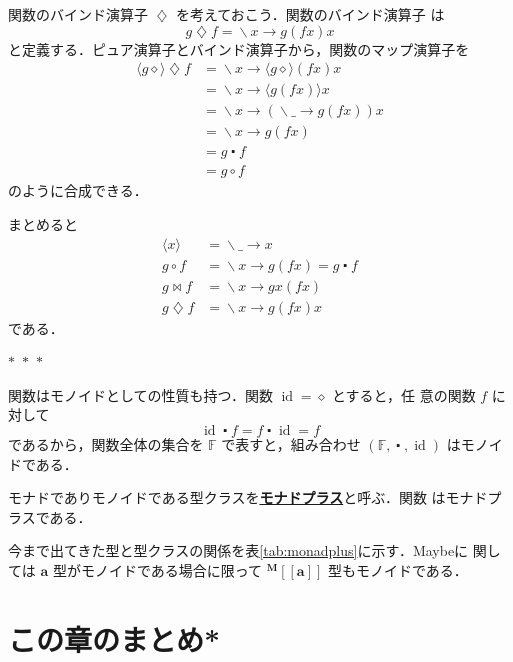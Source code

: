 \documentclass[a5paper,twoside,fleqn,draft]{jsbook}
\def\[{[\![}
\def\]{]\!]}
\newcommand{\separator}{\begin{center}$*$~$*$~$*$\end{center}}
\newcommand{\keyword}[1]{{\underline{\textbf{#1}}}}
\newcommand{\mAnonParam}{\diamond}
\newcommand{\mSpecialFunc}[1]{#1}
\DeclareMathOperator{\mId}{\mSpecialFunc{id}}
\DeclareMathOperator{\mAppMapFunc}{\bowtie}
\DeclareMathOperator{\mBindFunc}{\diamondsuit}
\DeclareMathOperator{\mComp}{\centerdot}
\DeclareMathOperator{\mLambda}{\backslash}
\DeclareMathOperator{\mLambdaArrow}{\rightarrow}
\DeclareMathOperator{\mMapFunc}{\circ}
\newcommand{\mSpecialSet}[1]{\mathbb{#1}}
\newcommand{\mFSet}{\mSpecialSet{F}}
\newcommand{\mType}[1]{\mathbf{#1}} %
\newcommand{\mA}{\mType{a}}
\newcommand{\mTypeAssemble}[2]{{}^\mType{#1}\[\mType{#2}\]}
\newcommand{\mMaybeType}[1]{\mTypeAssemble{M}{#1}}
\newcommand{\mFuncWith}[1]{\langle#1\rangle}
\newcommand{\mLambdaEXP}[2]{\mLambda{#1}\mLambdaArrow{#2}} %
\begin{document}
関数のバインド演算子 $\mBindFunc$ を考えておこう．関数のバインド演算子
は
\begin{equation}
g\mBindFunc f=\mLambdaEXP{x}{g(fx)x}
\end{equation}
と定義する．ピュア演算子とバインド演算子から，関数のマップ演算子を
\begin{align}
\mFuncWith{g\mAnonParam}\mBindFunc f
&=\mLambdaEXP{x}{\mFuncWith{g\mAnonParam}(fx)x}\\
&=\mLambdaEXP{x}{\mFuncWith{g(fx)}x}\\
&=\mLambdaEXP{x}{(\mLambdaEXP{\_}{g(fx)})x}\\
&=\mLambdaEXP{x}{g(fx)}\\
&=g\mComp f\\
&=g\mMapFunc f
\end{align}
のように合成できる．

まとめると
\begin{align}
\mFuncWith{x}&=\mLambdaEXP{\_}{x}\\
g\mMapFunc f&=\mLambdaEXP{x}{g(fx)}=g\mComp f\\
g\mAppMapFunc f&=\mLambdaEXP{x}{gx(fx)}\\
g\mBindFunc f&=\mLambdaEXP{x}{g(fx)x}
\end{align}
である．


\separator

関数はモノイドとしての性質も持つ．関数 $\mId=\mAnonParam$ とすると，任
意の関数 $f$ に対して
\begin{equation}
\mId\mComp f=f\mComp\mId=f
\end{equation}
であるから，関数全体の集合を $\mFSet$ で表すと，組み合わせ
$(\mFSet,\mComp,\mId)$ はモノイドである．

モナドでありモノイドである型クラスを\keyword{モナドプラス}と呼ぶ．関数
はモナドプラスである．

今まで出てきた型と型クラスの関係を表\ref{tab:monadplus}に示す．Maybeに
関しては $\mA $ 型がモノイドである場合に限って $\mMaybeType{a}$
型もモノイドである．

\section{この章のまとめ*}
\end{document}
